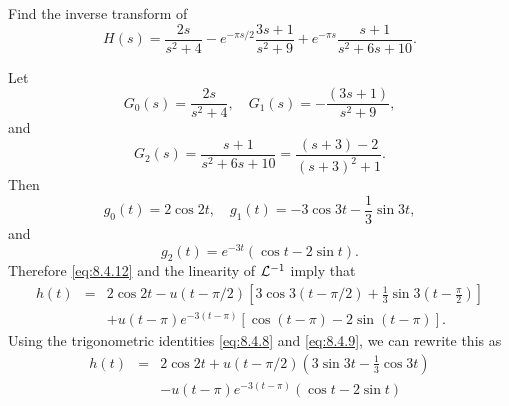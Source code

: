 \documentclass{ximera}
\begin{document}
\begin{example}\label{example:8.4.8}
 Find the inverse transform of
$$
H(s)=\frac{2s}{s^2+4}-e^{-\pi s/2} \frac{3s+1}{s^2+9}+e^{-\pi
s}\frac{s+1}{s^2+6s+10}.
$$
\begin{explanation}
Let
$$
G_0(s)=\frac{2s}{s^2+4},\quad G_1(s)=-\frac{(3s+1)}{s^2+9},
$$
and
$$
G_2(s)=\frac{s+1}{s^2+6s+10}=\frac{(s+3)-2}{(s+3)^2+1}.
$$
Then
$$
g_0(t)=2\cos 2t,\quad g_1(t)=-3\cos 3t-\frac{1}{3}\sin 3t,
$$
and
$$
g_2(t)=e^{-3t}(\cos t-2\sin t).
$$
Therefore \eqref{eq:8.4.12} and the linearity of ${\cal L}^{-1}$
imply that
\begin{eqnarray*}
h(t)&=&2\cos 2t-u(t-\pi/2)\left[3\cos
3(t-\pi/2)+\frac{1}{3}\sin 3\left(t-\frac{\pi}{2}\right)\right]\\
&&+u(t-\pi)e^{-3(t-\pi)}\left[\cos (t-\pi)-2\sin (t-\pi)\right].
\end{eqnarray*}
Using the trigonometric identities  \eqref{eq:8.4.8} and
\eqref{eq:8.4.9}, we can rewrite this as
\begin{equation} \label{eq:8.4.13}
\begin{array}{rcl}
h(t)&=&2\cos 2t+u(t-\pi/2)\left(3\sin 3t-
\frac{1}{3}\cos 3t\right)\\
&&-u(t-\pi)e^{-3(t-\pi)} (\cos t-2\sin t)
\end{array}
\end{equation}

\begin{center}
\end{center}




\end{explanation}
\end{example}
\end{document}
